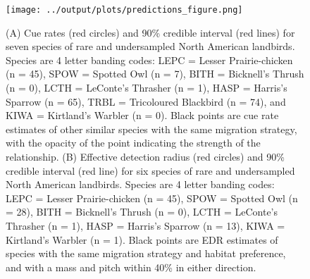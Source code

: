 \documentclass[12pt]{article}
\begin{document}
\begin{figure}[h]
	\texttt{[image: ../output/plots/predictions\_figure.png]}
	\caption{(A) Cue rates (red circles) and 90\% credible interval (red lines) for seven species of rare and undersampled North American landbirds. Species are 4 letter banding codes: LEPC = Lesser Prairie-chicken (n = 45), SPOW = Spotted Owl (n = 7), BITH = Bicknell's Thrush (n = 0), LCTH = LeConte's Thrasher (n = 1), HASP = Harris's Sparrow (n = 65), TRBL = Tricoloured Blackbird (n = 74), and KIWA = Kirtland's Warbler (n = 0). Black points are cue rate estimates of other similar species with the same migration strategy, with the opacity of the point indicating the strength of the relationship. (B) Effective detection radius (red circles) and 90\% credible interval (red line) for six species of rare and undersampled North American landbirds. Species are 4 letter banding codes: LEPC = Lesser Prairie-chicken (n = 45), SPOW = Spotted Owl (n = 28), BITH = Bicknell's Thrush (n = 0), LCTH = LeConte's Thrasher (n = 1), HASP = Harris's Sparrow (n = 13), KIWA = Kirtland's Warbler (n = 1). Black points are EDR estimates of species with the same migration strategy and habitat preference, and with a mass and pitch within 40\% in either direction.}
	\label{fig:predictions}
\end{figure}
\end{document}
